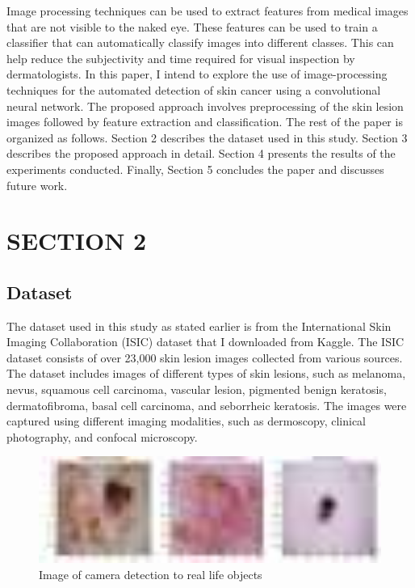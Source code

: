 \documentclass{article}
\begin{document}
Image processing techniques can be used to extract features from medical images that are not visible to the naked eye. These features can be used to train a classifier that can automatically classify images into different classes. This can help reduce the subjectivity and time required for visual inspection by dermatologists.
In this paper, I intend to explore the use of image-processing techniques for the automated detection of skin cancer using a convolutional neural network. The proposed approach involves preprocessing of the skin lesion images followed by feature extraction and classification. The rest of the paper is organized as follows.  Section 2 describes the dataset used in this study. Section 3 describes the proposed approach in detail. Section 4 presents the results of the experiments conducted. Finally, Section 5 concludes the paper and discusses future work.


\section{SECTION 2}
\subsection{Dataset}
The dataset used in this study as stated earlier is from the International Skin Imaging Collaboration (ISIC) dataset that I downloaded from Kaggle. The ISIC dataset consists of over 23,000 skin lesion images collected from various sources. The dataset includes images of different types of skin lesions, such as melanoma, nevus, squamous cell carcinoma, vascular lesion, pigmented benign keratosis, dermatofibroma, basal cell carcinoma, and seborrheic keratosis. The images were captured using different imaging modalities, such as dermoscopy, clinical photography, and confocal microscopy.


\begin{figure}
  \includegraphics[width=2.5\textwidth]{derry.jpg}
  \caption{Image of camera detection to real life objects}
  \label{fig: Sample dataset}
\end{figure}
\end{document}
